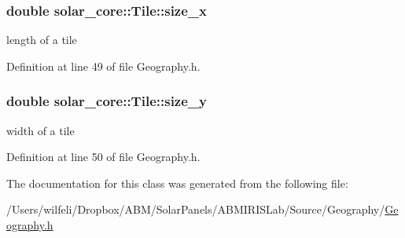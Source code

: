 \subsubsection[{size\+\_\+x}]{\setlength{\rightskip}{0pt plus 5cm}double solar\+\_\+core\+::\+Tile\+::size\+\_\+x\hspace{0.3cm}{\ttfamily [protected]}}\label{classsolar__core_1_1_tile_ae8615b87d6d0c614de01b497fa63c27b}
length of a tile 

Definition at line 49 of file Geography.\+h.

\hypertarget{classsolar__core_1_1_tile_a698ac57539f58ed4e0a54b3135be6fb9}{}
\subsubsection[{size\+\_\+y}]{\setlength{\rightskip}{0pt plus 5cm}double solar\+\_\+core\+::\+Tile\+::size\+\_\+y\hspace{0.3cm}{\ttfamily [protected]}}\label{classsolar__core_1_1_tile_a698ac57539f58ed4e0a54b3135be6fb9}
width of a tile 

Definition at line 50 of file Geography.\+h.



The documentation for this class was generated from the following file\+:\begin{DoxyCompactItemize}
\item 
/\+Users/wilfeli/\+Dropbox/\+A\+B\+M/\+Solar\+Panels/\+A\+B\+M\+I\+R\+I\+S\+Lab/\+Source/\+Geography/\hyperlink{_geography_8h}{Geography.\+h}\end{DoxyCompactItemize}
